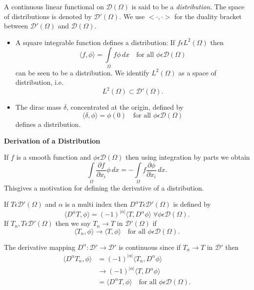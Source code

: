 A continuous linear functional on $\mathscr{D}(\Omega)$ is said to be
a {\it distribution}. The space of distributions is denoted by
$\mathscr{D}'(\Omega)$. We use $<\cdotp,\cdotp>$ for the duality
bracket between $\mathscr{D}'(\Omega)$ and $\mathscr{D}(\Omega)$.

\begin{exam}\label{chap1:exam1}
\begin{itemize}
\item [(a)] A square integrable function defines a distribution: If
$f\epsilon L^2(\Omega)$ then 
$$
\langle f, \phi \rangle=\int\limits_\Omega f\phi \,dx 
\quad \text{for all } \phi\epsilon \mathscr{D}(\Omega)
$$
can be seen to be a distribution. We identify $L^2(\Omega)$ as a space
of distribution, i.e.
$$
L^2(\Omega)\subset\mathscr{D}'(\Omega).
$$
\item [(b)] The dirac mass $\delta$, concentrated at the origin,
  defined by 
$$
\langle\delta,\phi \rangle=\phi(0)\quad\text{for all }
\phi\epsilon\mathscr{D}(\Omega)
$$
defines a distribution. 
\end{itemize}
\end{exam}

\begin{def*}
{\bf Derivation of a Distribution}

If $f$ is a smooth function and $\phi\epsilon\mathscr{D}(\Omega)$
then using integration by parts we obtain
$$
\int\limits_\Omega\frac{\partial f}{\partial x_i}\phi \,dx= -
\int\limits_\Omega f\frac{\partial\phi}{\partial x_i} \,dx.
$$
This\pageoriginale gives a motivation for defining the derivative of a
distribution.

If $T\epsilon\mathscr{D}'(\Omega)$ and $\alpha$ is a multi index
then $D^\alpha T\epsilon\mathscr{D}'(\Omega)$ is defined by
$$
\langle D^\alpha T, \phi \rangle=(-1)^{|\alpha|}\langle T, 
D^\alpha\phi \rangle \; \forall \phi\epsilon \mathscr{D}(\Omega).
$$
If $T_n, T\epsilon \mathscr{D}'(\Omega)$ then we say $T_n\to T$ in
$\mathscr{D}'(\Omega)$ if 
$$
\langle T_n, \phi \rangle\to 
\langle T, \phi \rangle\quad \text{for all }\phi\epsilon\mathscr{D}
(\Omega).
$$

The derivative mapping $D^\alpha :\mathscr{D}'\to\mathscr{D}'$ is
continuous since if $T_n\to T$ in $\mathscr{D}'$ then
\begin{align*}
\langle D^\alpha T_n, \phi \rangle &=(-1)^{|\alpha|} \langle T_n, D^\alpha \phi \rangle\\
&\to (-1)^{|\alpha|} \langle T, D^\alpha\phi \rangle\\
&= \langle D^\alpha T, \phi \rangle\quad \text{for all } \phi\epsilon \mathscr{D}
(\Omega). 
\end{align*}
\end{def*}

